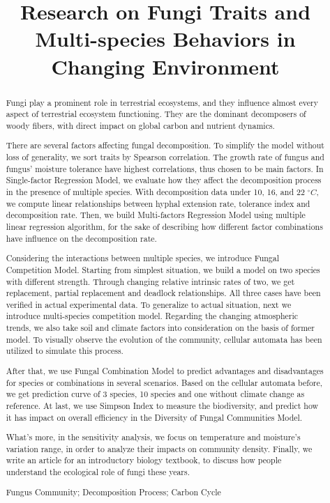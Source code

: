 \documentclass{mcmthesis}
\title{Research on Fungi Traits and Multi-species Behaviors in Changing Environment}
\begin{document}
\begin{abstract}
  
  Fungi play a prominent role in terrestrial ecosystems, and they influence almost every aspect of terrestrial ecosystem functioning. They are the dominant decomposers of woody fibers, with direct impact on global carbon and nutrient dynamics.

  There are several factors affecting fungal decomposition. To simplify the model without loss of generality, we sort traits by Spearson correlation. The growth rate of fungus and fungus' moisture tolerance have highest correlations, thus chosen to be main factors. In Single-factor Regression Model, we evaluate how they affect the decomposition process in the presence of multiple species. With decomposition data under 10, 16, and 22 $^\circ C$, we compute linear relationships between hyphal extension rate, tolerance index and decomposition rate. Then, we build Multi-factors Regression Model using multiple linear regression algorithm, for the sake of describing how different factor combinations have influence on the decomposition rate. 
  
  Considering the interactions between multiple species, we introduce Fungal Competition Model. Starting from simplest situation, we build a model on two species with different strength. Through changing relative intrinsic rates of two, we get replacement, partial replacement and deadlock relationships. All three cases have been verified in actual experimental data. To generalize to actual situation, next we introduce multi-species competition model. Regarding the changing atmospheric trends, we also take soil and climate factors into consideration on the basis of former model. To visually observe the evolution of the community, cellular automata has been utilized to simulate this process.
  
  After that, we use Fungal Combination Model to predict advantages and disadvantages for species or combinations in several scenarios. Based on the cellular automata before, we get prediction curve of 3 species, 10 species and one without climate change as reference. At last, we use Simpson Index to measure the biodiversity, and predict how it has impact on overall efficiency in the Diversity of Fungal Communities Model.
  
  What's more, in the sensitivity analysis, we focus on temperature and moisture's variation range, in order to analyze their impacts on community density. Finally, we write an article for an introductory biology textbook, to discuss how people understand the ecological role of fungi these years. 

\begin{keywords}
  Fungus Community; Decomposition Process; Carbon Cycle
\end{keywords}
\end{abstract}
\maketitle
\tableofcontents
\end{document}
